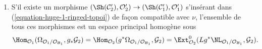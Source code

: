 \begin{lemma}
\begin{enumerate}
un morphisme de topos annelés
$(\Sh(\mathcal{C}'_2), \mathcal{O}'_2) \to
(\Sh(\mathcal{C}'_1), \mathcal{O}'_1)$ s'insérant dans
(\ref{equation-huge-1-ringed-topoi}) de façon compatible avec $\nu$.
\item S'il existe un morphisme
$(\Sh(\mathcal{C}'_2), \mathcal{O}'_2) \to
(\Sh(\mathcal{C}'_1), \mathcal{O}'_1)$ s'insérant dans
(\ref{equation-huge-1-ringed-topoi}) de façon compatible avec $\nu$, l'ensemble
de tous ces morphismes est un espace principal homogène sous
$$
\Hom_{\mathcal{O}_1}(
\Omega_{\mathcal{O}_1/\mathcal{O}_{\mathcal{B}_1}}, g_*\mathcal{G}_2) =
\Hom_{\mathcal{O}_2}(
g^*\Omega_{\mathcal{O}_1/\mathcal{O}_{\mathcal{B}_1}}, \mathcal{G}_2) =
\Ext^0_{\mathcal{O}_2}(
Lg^*\NL_{\mathcal{O}_1/\mathcal{O}_{\mathcal{B}_1}}, \mathcal{G}_2).
$$
\end{enumerate}
\end{lemma}

